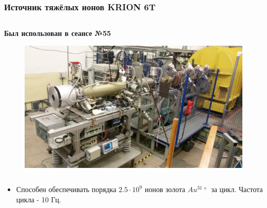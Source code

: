 \documentclass[dvipsnames] {beamer}
\begin{document}
\begin{frame}
  \frametitle{\bf \centering Источник тяжёлых ионов KRION 6T}
  \begin{columns}[c]
    \begin{block}{\bf \centering Был использован в сеансе №55}
      \begin{figure}[H]
        \includegraphics[width=1.\linewidth]{krion6T.jpg} 
      \end{figure}
    \end{block}
      \end{columns}
    {\bf 
    \begin{block}{}
      \begin{itemize}
      \item Способен обеспечивать порядка $2.5 \cdot 10^{9}$ ионов золота $Au^{31+}$ за цикл. Частота цикла - 10 Гц.
      \end{itemize}
    \end{block}
    } 
\end{frame}
\end{document}
